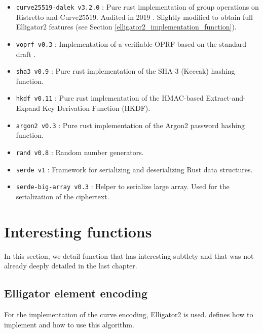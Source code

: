 ﻿\documentclass[../report.tex]{subfiles}
\begin{document}
\begin{itemize}
 \item \verb|curve25519-dalek v3.2.0| : Pure rust implementation of group operations on Ristretto and Curve25519. Audited in 2019 \cite{Curve25519_Dalek_Audit}. Slightly modified to obtain full Elligator2 features (see Section \ref{elligator2_implementation_function}).
 \item \verb|voprf v0.3| : Implementation of a verifiable OPRF based on the standard draft \cite{VOPRF_Standard_Draft}.
 \item \verb|sha3 v0.9| : Pure rust implementation of the SHA-3 (Keccak) hashing function.
 \item \verb|hkdf v0.11| : Pure rust implementation of the HMAC-based Extract-and-Expand Key Derivation Function (HKDF).
 \item \verb|argon2 v0.3| : Pure rust implementation of the Argon2 password hashing function.
\item \verb|rand v0.8| : Random number generators.
 \item \verb|serde v1| : Framework for serializing and deserializing Rust data structures.
 \item \verb|serde-big-array v0.3| : Helper to serialize large array. Used for the serialization of the ciphertext.
\end{itemize}


\section{Interesting functions}
In this section, we detail function that has interesting subtlety and that was not already deeply detailed in the last chapter.
\subsection{Elligator element encoding} \label{sec:elligator2_implementation_function}
For the implementation of the curve encoding, Elligator2 is used.
\cite{Elligator2_Paper} defines how to implement and how to use this algorithm.
\end{document}
